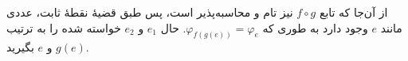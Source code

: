 از آن‌جا که تابع $f \circ g$ نیز تام و محاسبه‌پذیر است، پس طبق قضیهٔ نقطهٔ ثابت، عددی مانند $e$ وجود دارد به طوری که $\varphi_{f(g(e))} = \varphi_e$. حال $e_1$ و $e_2$ خواسته شده را به ترتیب $g(e)$ و $e$ بگیرید.